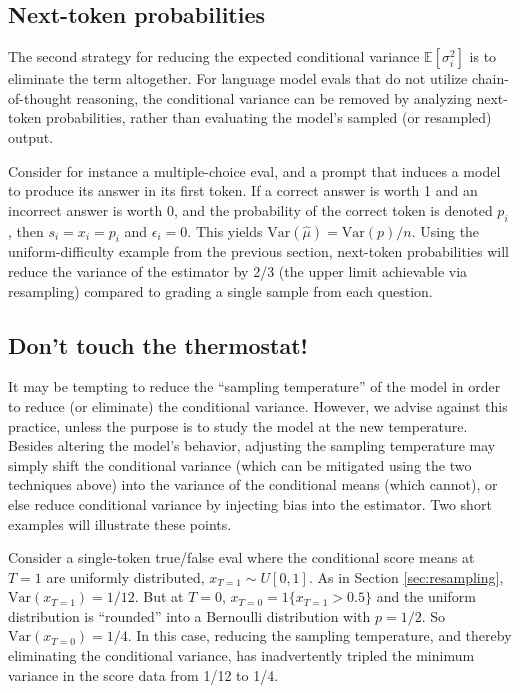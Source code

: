 \documentclass[11pt, oneside]{article}   	%
\newcommand{\E}{\mathbb{E}}
\newcommand{\Var}{\mathrm{Var}}
\begin{document}
\subsection{Next-token probabilities}

The second strategy for reducing the expected conditional variance $\E[\sigma_i^2]$ is to eliminate the term altogether. For language model evals that do not utilize chain-of-thought reasoning, the conditional variance can be removed by analyzing next-token probabilities, rather than evaluating the model’s sampled (or resampled) output.

Consider for instance a multiple-choice eval, and a prompt that induces a model to produce its answer in its first token. If a correct answer is worth 1 and an incorrect answer is worth 0, and the probability of the correct token is denoted $p_i$, then $s_i=x_i=p_i$ and $\epsilon_i=0$. This yields $\Var(\hat{\mu})=\Var(p)/n$. Using the uniform-difficulty example from the previous section, next-token probabilities will reduce the variance of the estimator by 2/3 (the upper limit achievable via resampling) compared to grading a single sample from each question.

\subsection{Don't touch the thermostat!}

It may be tempting to reduce the ``sampling temperature''\cite{hinton2015distillingknowledgeneuralnetwork} of the model in order to reduce (or eliminate) the conditional variance. However, we advise against this practice, unless the purpose is to study the model at the new temperature. Besides altering the model’s behavior, adjusting the sampling temperature may simply shift the conditional variance (which can be mitigated using the two techniques above) into the variance of the conditional means (which cannot), or else reduce conditional variance by injecting bias into the estimator. Two short examples will illustrate these points.

Consider a single-token true/false eval where the conditional score means at $T=1$ are uniformly distributed, $x_{T=1}\sim U[0, 1]$. As in Section \ref{sec:resampling}, $\Var(x_{T=1})=1/12$. But at $T=0$, $x_{T=0}=1\{x_{T=1}>0.5\}$ and the uniform distribution is ``rounded'' into a Bernoulli distribution with $p=1/2$. So $\Var(x_{T=0})=1/4$. In this case, reducing the sampling temperature, and thereby eliminating the conditional variance, has inadvertently tripled the minimum variance in the score data from 1/12 to 1/4.
\end{document}
